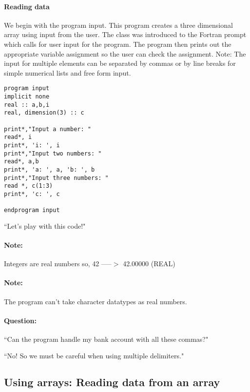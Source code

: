 \documentclass[11pt]{article}
\begin{document}
\paragraph{Reading data} We begin with the program input. This program creates a three dimensional array using input from the user. The class was introduced to the Fortran prompt which calls for user input for the program. The program then prints out the appropriate variable assignment so the user can check the assignment. Note: The input for multiple elements can be separated by commas or by line breaks for simple numerical lists and free form input.\\
\noindent
\begin{minipage}[t]{0.4\textwidth}
\begin{lstlisting}
program input
implicit none
real :: a,b,i
real, dimension(3) :: c

print*,"Input a number: "
read*, i
print*, 'i: ', i
print*,"Input two numbers: "
read*, a,b
print*, 'a: ', a, 'b: ', b
print*,"Input three numbers: "
read *, c(1:3)
print*, 'c: ', c

endprogram input
\end{lstlisting}
	\end{minipage}
\hfill
\begin{minipage}[t]{0.5\textwidth}
\par``Let's play with this code!"

\paragraph{Note:}Integers are real numbers so, 42 -----$>$ 42.00000 (REAL)

\paragraph{Note:}The program can't take character datatypes as real numbers.

\paragraph{Question:}``Can the program handle my bank account with all these commas?"\\

\par``No! So we must be careful when using multiple delimiters."
\end{minipage}

\subsection{Using arrays: Reading data from an array}
\end{document}
